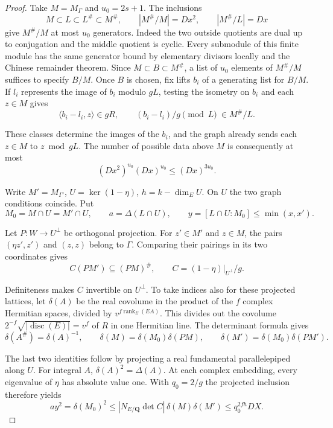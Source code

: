 \begin{proof}
Take \(M=M_\Gamma\) and \(u_0=2s+1\). The inclusions
\[
 M\subset L\subset L^\#\subset M^\#,\qquad
 |M^\#/M|=Dx^2,\qquad |M^\#/L|=Dx
\]
give \(M^\#/M\) at most \(u_0\) generators. Indeed the two outside
quotients are dual up to conjugation and the middle quotient is cyclic.
Every submodule of this finite module has the same generator bound
by elementary divisors locally and the Chinese remainder theorem.
Since \(M\subset B\subset M^\#\), a list of \(u_0\) elements
of \(M^\#/M\) suffices to specify \(B/M\). Once \(B\) is chosen,
fix lifts \(b_i\) of a generating list for \(B/M\). If \(l_i\)
represents the image of \(b_i\) modulo \(gL\), testing the isometry
on \(b_i\) and each \(z\in M\) gives
\[
 \langle b_i-l_i,z\rangle\in gR,\qquad
             (b_i-l_i)/g\pmod L\ \in M^\#/L .
\]

These classes determine the images of the \(b_i\), and the graph
already sends each \(z\in M\) to \(z\bmod gL\). The number of
possible data above \(M\) is consequently at most
\[
        (Dx^2)^{u_0}(Dx)^{u_0}\le(Dx)^{3u_0}.
\]

Write \(M'=M_{\Gamma'}\), \(U=\ker(1-\eta)\), \(h=k-\dim_E U\).
On \(U\) the two graph conditions coincide. Put
\[
 M_0=M\cap U=M'\cap U,\qquad a=\Delta(L\cap U),\qquad
 y=[L\cap U:M_0]\le\min(x,x').
\]

Let \(P:W\to U^\perp\) be orthogonal projection. For \(z'\in M'\)
and \(z\in M\), the pairs \((\eta z',z')\) and \((z,z)\) belong
to \(\Gamma\). Comparing their pairings in its two coordinates gives
\[
    C(PM')\subseteq(PM)^\#,\qquad
                C=(1-\eta)|_{U^\perp}/g .
\]

Definiteness makes \(C\) invertible on \(U^\perp\). To take indices
also for these projected lattices, let \(\delta(A)\) be the real
covolume in the product of the \(f\) complex Hermitian spaces,
divided by \(v^{f\operatorname{rank}_E(EA)}\). This divides out
the covolume \(2^{-f}\sqrt{|\operatorname{disc}(E)|}=v^f\)
of \(R\) in one Hermitian line. The determinant formula gives
\[
  \delta(A^\#)=\delta(A)^{-1},\qquad
  \delta(M)=\delta(M_0)\delta(PM),\qquad
  \delta(M')=\delta(M_0)\delta(PM').
\]

The last two identities follow by projecting a real fundamental
parallelepiped along \(U\). For integral \(A\),
\(\delta(A)^2=\Delta(A)\). At each complex embedding, every
eigenvalue of \(\eta\) has absolute value one. With \(q_0=2/g\)
the projected inclusion therefore yields
\begin{equation}\label{eq:zero-gram-fixed-discriminant}
  ay^2=\delta(M_0)^2
   \le |N_{E/\mathbf Q}\det C|\,\delta(M)\delta(M')
   \le q_0^{2fh}DX .
\end{equation}


\end{proof}
